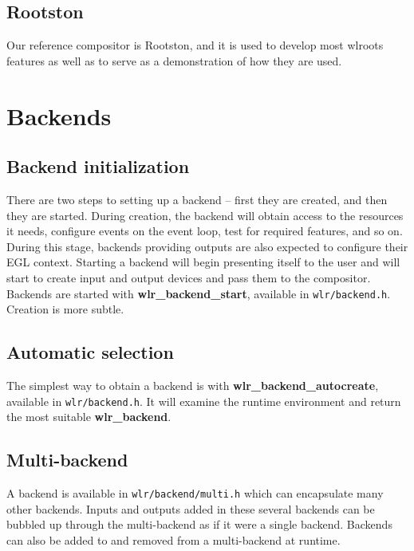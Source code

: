 \documentclass{article}
\newcommand{\code}[1]{\texttt{#1}}
\begin{document}
\subsection{Rootston}\label{rootston}

Our reference compositor is Rootston, and it is used to develop most wlroots
features as well as to serve as a demonstration of how they are used.

\newpage
\section{Backends}\label{backends}

\subsection{Backend initialization}\label{backend init}

There are two steps to setting up a backend -- first they are created, and then
they are started. During creation, the backend will obtain access to the
resources it needs, configure events on the event loop, test for required
features, and so on. During this stage, backends providing outputs are also
expected to configure their EGL context. Starting a backend will begin
presenting itself to the user and will start to create input and output devices
and pass them to the compositor. Backends are started with
\textbf{wlr_backend_start}, available in \code{wlr/backend.h}. Creation is more
subtle.

\subsection{Automatic selection}\label{backend autocreate}

The simplest way to obtain a backend is with \textbf{wlr_backend_autocreate},
available in \code{wlr/backend.h}. It will examine the runtime environment and
return the most suitable \textbf{wlr_backend}.

\subsection{Multi-backend}\label{multi backend}

A backend is available in \code{wlr/backend/multi.h} which can encapsulate many
other backends. Inputs and outputs added in these several backends can be
bubbled up through the multi-backend as if it were a single backend. Backends
can also be added to and removed from a multi-backend at runtime.
\end{document}
